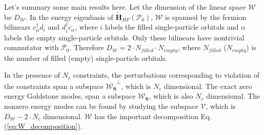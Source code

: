 \begin{subappendices}
Let's summary some main results here. Let the dimension of the linear space $\boldsymbol{\mathcal W}$ be $D_{\boldsymbol{\mathcal W}}$. In the energy eigenbasis of $\tilde {\mathbf H}_{HF}(\boldsymbol{\mathcal P}_0)$, $\boldsymbol{\mathcal W}$ is spanned by the fermion bilinears $c_{\alpha}^{\dagger} d_{i}$ and $d_{i}^{\dagger} c_{\alpha}$, where $i$ labels the filled single-particle orbitals and $\alpha$ labels the empty single-particle orbitals. Only these bilinears have nontrivial commutator with $\boldsymbol{\mathcal P}_0$. Therefore $D_{\boldsymbol{\mathcal W}}=2\cdot N_{filled}\cdot N_{empty}$, where $N_{filled}$ ($N_{empty}$) is the number of filled (empty) single-particle orbitals. 

In the presence of $N_c$ constraints, the perturbations corresponding to violation of the constraints span a subspace $\overline{\boldsymbol{\mathcal W}_{\mathbf S}}^\perp$, which is $N_c$ dimensional. The exact zero energy Goldstone modes, span a subspace $\boldsymbol{\mathcal W}_{\mathbf S}$, which is also $N_c$ dimensional. The nonzero energy modes can be found by studying the subspace $\boldsymbol {\mathcal V}$, which is $D_{\boldsymbol{\mathcal W}}-2\cdot N_c$ dimensional. $\boldsymbol{\mathcal W}$ has the important decomposition Eq.(\ref{eq:W_decomposition}).



\end{subappendices}
